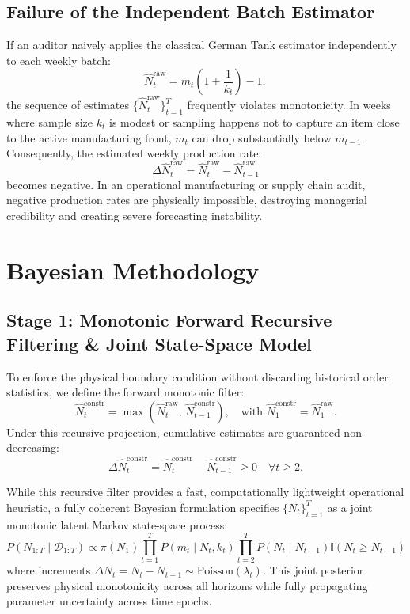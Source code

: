 \documentclass[11pt,a4paper]{article}
\begin{document}
\subsection{Failure of the Independent Batch Estimator}
If an auditor naively applies the classical German Tank estimator independently to each weekly batch:
\begin{equation}
\hat{N}_t^{\text{raw}} = m_t \left(1 + \frac{1}{k_t}\right) - 1,
\end{equation}
the sequence of estimates $\{\hat{N}_t^{\text{raw}}\}_{t=1}^T$ frequently violates monotonicity. In weeks where sample size $k_t$ is modest or sampling happens not to capture an item close to the active manufacturing front, $m_t$ can drop substantially below $m_{t-1}$. Consequently, the estimated weekly production rate:
\begin{equation}
\Delta \hat{N}_t^{\text{raw}} = \hat{N}_t^{\text{raw}} - \hat{N}_{t-1}^{\text{raw}}
\end{equation}
becomes negative. In an operational manufacturing or supply chain audit, negative production rates are physically impossible, destroying managerial credibility and creating severe forecasting instability.

\section{Bayesian Methodology}

\subsection{Stage 1: Monotonic Forward Recursive Filtering \& Joint State-Space Model}
To enforce the physical boundary condition without discarding historical order statistics, we define the forward monotonic filter:
\begin{equation}
\hat{N}_t^{\text{constr}} = \max\left( \hat{N}_t^{\text{raw}}, \, \hat{N}_{t-1}^{\text{constr}} \right), \quad \text{with } \hat{N}_1^{\text{constr}} = \hat{N}_1^{\text{raw}}.
\end{equation}
Under this recursive projection, cumulative estimates are guaranteed non-decreasing:
\begin{equation}
\Delta \hat{N}_t^{\text{constr}} = \hat{N}_t^{\text{constr}} - \hat{N}_{t-1}^{\text{constr}} \ge 0 \quad \forall t \ge 2.
\end{equation}

While this recursive filter provides a fast, computationally lightweight operational heuristic, a fully coherent Bayesian formulation specifies $\{N_t\}_{t=1}^T$ as a joint monotonic latent Markov state-space process:
\begin{equation}
P(N_{1:T} \mid \mathcal{D}_{1:T}) \propto \pi(N_1) \prod_{t=1}^T P(m_t \mid N_t, k_t) \prod_{t=2}^T P(N_t \mid N_{t-1}) \mathbb{I}(N_t \ge N_{t-1})
\end{equation}
where increments $\Delta N_t = N_t - N_{t-1} \sim \text{Poisson}(\lambda_t)$. This joint posterior preserves physical monotonicity across all horizons while fully propagating parameter uncertainty across time epochs.
\end{document}
